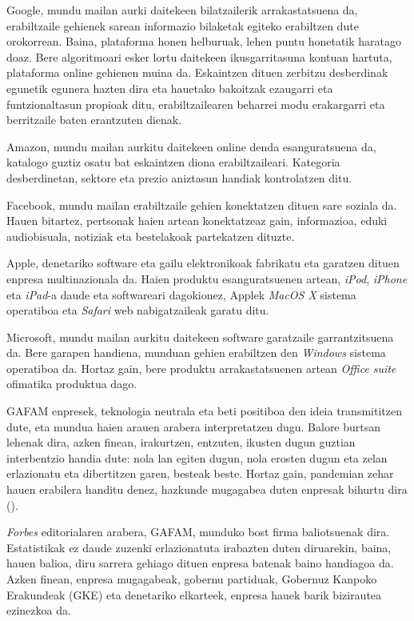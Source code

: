 Google, mundu mailan aurki daitekeen bilatzailerik arrakastatsuena da, erabiltzaile gehienek sarean informazio bilaketak egiteko erabiltzen dute orokorrean. Baina, plataforma honen helburuak, lehen puntu honetatik haratago doaz. Bere algoritmoari esker lortu daitekeen ikusgarritasuna kontuan hartuta, plataforma online gehienen muina da. Eskaintzen dituen zerbitzu desberdinak egunetik egunera hazten dira eta hauetako bakoitzak ezaugarri eta funtzionaltasun propioak ditu, erabiltzailearen beharrei modu erakargarri eta berritzaile baten erantzuten dienak.

Amazon, mundu mailan aurkitu daitekeen online denda esanguratsuena da, katalogo guztiz osatu bat eskaintzen diona erabiltzaileari. Kategoria desberdinetan, sektore eta prezio aniztasun handiak kontrolatzen ditu.

Facebook, mundu mailan erabiltzaile gehien konektatzen dituen sare soziala da. Hauen bitartez, pertsonak haien artean konektatzeaz gain, informazioa, eduki audiobisuala, notiziak eta bestelakoak partekatzen dituzte.

Apple, denetariko software eta gailu elektronikoak fabrikatu eta garatzen dituen enpresa multinazionala da. Haien produktu esanguratsuenen artean, \textit{iPod}, \textit{iPhone} eta \textit{iPad}-a daude eta softwareari dagokionez, Applek \textit{MacOS X} sistema operatiboa eta \textit{Safari} web nabigatzaileak garatu ditu.

Microsoft, mundu mailan aurkitu daitekeen software garatzaile garrantzitsuena da. Bere garapen handiena, munduan gehien erabiltzen den \textit{Windows} sistema operatiboa da. Hortaz gain, bere produktu arrakastatsuenen artean \textit{Office suite} ofimatika produktua dago.

GAFAM enpresek, teknologia neutrala eta beti positiboa den ideia transmititzen dute, eta mundua haien arauen arabera interpretatzen dugu. Balore burtsan lehenak dira, azken finean, irakurtzen, entzuten, ikusten dugun guztian interbentzio handia dute: nola lan egiten dugun, nola erosten dugun eta zelan erlazionatu eta dibertitzen garen, besteak beste. Hortaz gain, pandemian zehar hauen erabilera handitu denez, hazkunde mugagabea duten enpresak bihurtu dira (\cite{eavis2020big}).

\textit{Forbes} editorialaren arabera, GAFAM, munduko bost firma baliotsuenak dira. Estatistikak ez daude zuzenki erlazionatuta irabazten duten diruarekin, baina, hauen balioa, diru sarrera gehiago dituen enpresa batenak baino handiagoa da. Azken finean, enpresa mugagabeak, gobernu partiduak, Gobernuz Kanpoko Erakundeak (GKE) eta denetariko elkarteek, enpresa hauek barik bizirautea ezinezkoa da.

